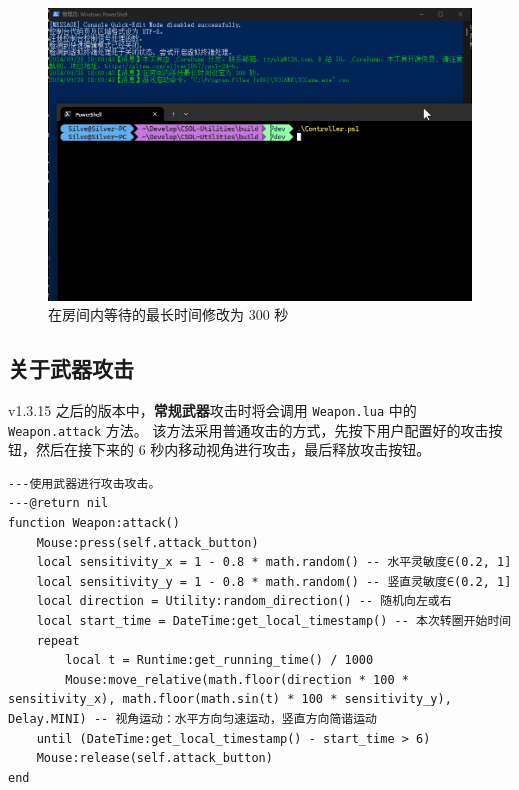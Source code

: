 \begin{figure}[H]
    \Centering
    \includegraphics[width=\textwidth]{documents/assets/advanced/change_max_wait_time_in_room_1.png}
    \caption{在房间内等待的最长时间修改为 300 秒}
    \label{ch7fig-change-max-wait-time-in-room-1}
\end{figure}

\subsection{关于武器攻击}

v1.3.15 之后的版本中，\textbf{常规武器}攻击时将会调用 \lstinline{Weapon.lua} 中的 \lstinline{Weapon.attack} 方法。
该方法采用普通攻击的方式，先按下用户配置好的攻击按钮，然后在接下来的 6 秒内移动视角进行攻击，最后释放攻击按钮。

\begin{verbatim}
---使用武器进行攻击攻击。
---@return nil
function Weapon:attack()
    Mouse:press(self.attack_button)
    local sensitivity_x = 1 - 0.8 * math.random() -- 水平灵敏度∈(0.2, 1]
    local sensitivity_y = 1 - 0.8 * math.random() -- 竖直灵敏度∈(0.2, 1]
    local direction = Utility:random_direction() -- 随机向左或右
    local start_time = DateTime:get_local_timestamp() -- 本次转圈开始时间
    repeat
        local t = Runtime:get_running_time() / 1000
        Mouse:move_relative(math.floor(direction * 100 * sensitivity_x), math.floor(math.sin(t) * 100 * sensitivity_y), Delay.MINI) -- 视角运动：水平方向匀速运动，竖直方向简谐运动
    until (DateTime:get_local_timestamp() - start_time > 6)
    Mouse:release(self.attack_button)
end
\end{verbatim}

